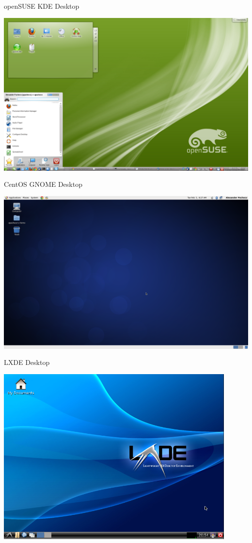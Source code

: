\documentclass[slidestop,mathserif,compress,xcolor=svgnames]{beamer}
\begin{document}
\begin{frame}{\small openSUSE KDE Desktop}
  \begin{center}
    \includegraphics[width=\textwidth]{./opensuse}
  \end{center}
\end{frame}
\begin{frame}{\small CentOS GNOME Desktop}
  \begin{center}
    \includegraphics[width=\textwidth]{./CentOS6_3}
  \end{center}
\end{frame}
\begin{frame}{\small LXDE Desktop}
  \begin{center}
    \includegraphics[width=0.9\textwidth]{./LXDE_desktop_full}
  \end{center}
\end{frame}
\end{document}
